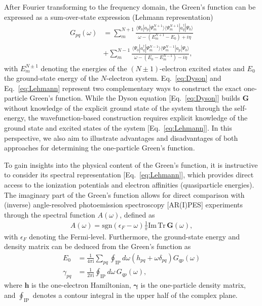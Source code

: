 \documentclass[aip,jcp,reprint,noshowkeys,superscriptaddress]{revtex4-2}
\newcommand{\bG}{\boldsymbol{G}}
\begin{document}
After Fourier transforming to the frequency domain, the Green's function can be expressed as a sum-over-state expression (Lehmann representation)
\begin{align}
    G_{pq}(\omega) &= \sum_{m}^{N+1} \frac{\langle \Psi_0 | a_p | \Psi_m^{N+1} \rangle \langle \Psi_m^{N+1} | a_q^\dagger | \Psi_0 \rangle}{\omega - (E_m^{N+1} - E_0) + i\eta} \nonumber \\
    &+ \sum_{m}^{N-1} \frac{\langle \Psi_0 | a_q^\dagger | \Psi_m^{N-1} \rangle \langle \Psi_m^{N-1} | a_p | \Psi_0 \rangle}{\omega - (E_0 - E_m^{N-1}) - i\eta}
    \label{eq:Lehmann},
\end{align}
with $E_m^{N\pm1}$ denoting the energies of the $(N\pm1)$-electron excited states and $E_0$ the ground-state energy of the $N$-electron system.
Eq.~\eqref{eq:Dyson} and Eq.~\eqref{eq:Lehmann} represent two complementary ways to construct the exact one-particle Green's function.
While the Dyson equation [Eq.~\eqref{eq:Dyson}] builds $\bG$ without knowledge of the explicit ground state of the system through the self-energy, the wavefunction-based construction requires explicit knowledge of the ground state and excited states of the system [Eq.~\eqref{eq:Lehmann}].
In this perspective, we also aim to illustrate advantages and disadvantages of both approaches for determining the one-particle Green's function.

To gain insights into the physical content of the Green's function, it is instructive to consider its spectral representation [Eq.~\eqref{eq:Lehmann}], which provides direct access to the ionization potentials and electron affinities (quasiparticle energies).
The imaginary part of the Green's function allows for direct comparison with (inverse) angle-resolved photoemission spectroscopy [AR(I)PES] experiments through the spectral function $A(\omega)$, defined as
\begin{align}
    A(\omega) = \mathrm{sgn}(\epsilon_F - \omega) \frac{1}{\pi} \mathrm{Im} \, \mathrm{Tr} \, \bG(\omega),
\end{align}
with $\epsilon_F$ denoting the Fermi-level.
Furthermore, the ground-state energy and density matrix can be deduced from the Green's function as
\begin{align}
    E_0 &= \frac{1}{4 \pi \mathrm{i}} \sum_{pq} \oint_\mathrm{IP} d\omega \left(h_{pq} + \omega \delta_{pq} \right) G_{qp}(\omega) \\
    \gamma_{pq} &= \frac{1}{2 \pi \mathrm{i}} \oint_\mathrm{IP} d\omega \, G_{qp}(\omega),
\end{align}
where $\mathbf{h}$ is the one-electron Hamiltonian, $\boldsymbol{\gamma}$ is the one-particle density matrix, and $\oint_\mathrm{IP}$ denotes a contour integral in the upper half of the complex plane.
\end{document}
